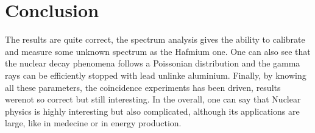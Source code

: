 \documentclass[a4paper,12pt,oneside]{article}
\begin{document}








\newpage
\section{Conclusion}
The results are quite correct, the spectrum analysis gives the ability to calibrate and measure some unknown spectrum as the Hafmium one. One can also see that the nuclear decay phenomena follows a Poissonian distribution and the gamma rays can be efficiently stopped with lead unlinke aluminium. Finally, by knowing all these parameters, the coincidence experiments has been driven, results werenot so correct but still interesting. In the overall, one can say that Nuclear physics is highly interesting but also complicated, although its applications are large, like in medecine or in energy production.




\end{document}

